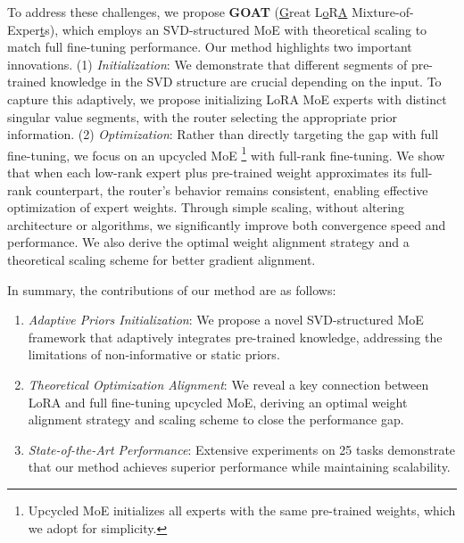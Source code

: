 To address these challenges, we propose \textbf{GOAT} (\underline{G}reat L\underline{o}R\underline{A} Mixture-of-Exper\underline{t}s), which employs an SVD-structured MoE with theoretical scaling to match full fine-tuning performance. 
Our method highlights two important innovations.
(1) \textit{Initialization}: We demonstrate that different segments of pre-trained knowledge in the SVD structure are crucial depending on the input. To capture this adaptively, we propose initializing LoRA MoE experts with distinct singular value segments, with the router selecting the appropriate prior information.
(2) \textit{Optimization}: 
Rather than directly targeting the gap with full fine-tuning, we focus on an upcycled MoE \footnote{Upcycled MoE initializes all experts with the same pre-trained weights, which we adopt for simplicity.} with full-rank fine-tuning. 
{We show that when each low-rank expert plus pre-trained weight approximates its full-rank counterpart, the router's behavior remains consistent, enabling effective optimization of expert weights.}
Through simple scaling, without altering architecture or algorithms, we significantly improve both convergence speed and performance. We also derive the optimal weight alignment strategy and a theoretical scaling scheme for better gradient alignment.

In summary, the contributions of our method are as follows:  
\begin{enumerate}[label=\textbullet,leftmargin=*]
    \item \textit{Adaptive Priors Initialization}: We propose a novel SVD-structured MoE framework that adaptively integrates pre-trained knowledge, addressing the limitations of non-informative or static priors. 
    \item \textit{Theoretical Optimization Alignment}: We reveal a key connection between LoRA and full fine-tuning upcycled MoE, deriving an optimal weight alignment strategy and scaling scheme to close the performance gap.
    \item  \textit{State-of-the-Art Performance}: Extensive experiments on 25 tasks demonstrate that our method achieves superior performance while maintaining scalability. 
\end{enumerate}
